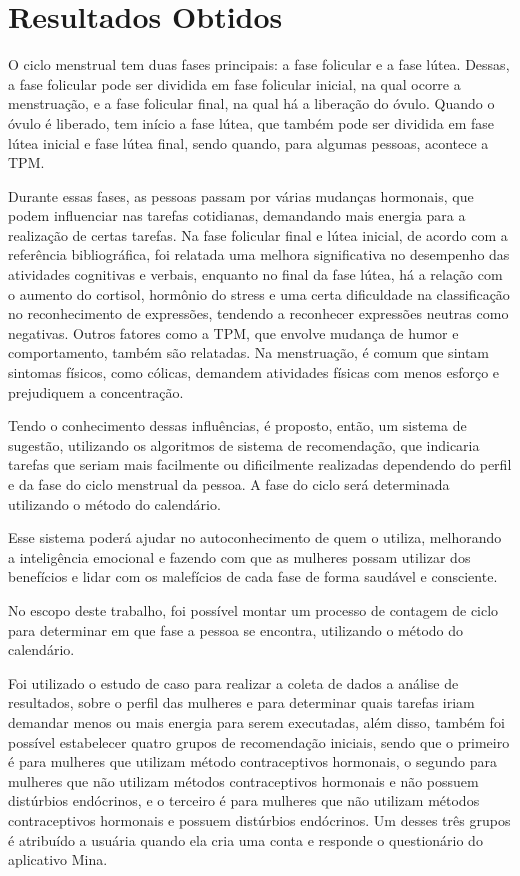 \chapter[Resultados Obtidos]{Resultados Obtidos}

O ciclo menstrual tem duas fases principais: a fase folicular e a fase lútea. Dessas, a fase folicular 
pode 
ser dividida em fase folicular inicial, na qual ocorre a menstruação, e a fase folicular final, na qual 
há a liberação do óvulo.
Quando o óvulo é liberado, tem início a fase lútea, que também pode ser dividida em fase lútea inicial e 
fase lútea final, sendo quando, para algumas pessoas, acontece a TPM.

Durante essas fases, as pessoas passam por várias mudanças hormonais, que podem influenciar nas tarefas 
cotidianas, demandando mais energia para a realização de certas tarefas. Na fase folicular final e lútea inicial, de acordo com a referência bibliográfica, 
foi relatada uma melhora significativa no desempenho das atividades cognitivas e verbais, enquanto no final da fase 
lútea, há a relação com o aumento do cortisol, hormônio do stress e uma certa dificuldade na classificação 
no reconhecimento de expressões, tendendo a reconhecer expressões neutras como negativas. Outros fatores como a TPM, que envolve
mudança de humor e comportamento, também são relatadas. Na menstruação, é comum que sintam sintomas físicos, como cólicas, demandem 
atividades físicas com menos esforço e prejudiquem a concentração. 

Tendo o conhecimento dessas influências, é proposto, então, um sistema de sugestão, utilizando os algoritmos de sistema de recomendação, 
que indicaria tarefas que seriam mais facilmente ou dificilmente realizadas dependendo do perfil e da fase do ciclo menstrual da pessoa. A fase 
do ciclo será determinada utilizando o método do calendário. 

Esse sistema poderá ajudar no autoconhecimento de quem o utiliza, melhorando a inteligência emocional e fazendo com que 
as mulheres possam utilizar dos benefícios e lidar com os malefícios de cada fase de forma saudável e consciente.

No escopo deste trabalho, foi possível montar um processo de contagem de ciclo para determinar em que fase a pessoa se encontra, utilizando o 
método do calendário.

Foi utilizado o estudo de caso para realizar a coleta de dados a análise de resultados, sobre o perfil das mulheres e para determinar quais tarefas iriam demandar 
menos ou mais energia para serem executadas, além disso, também foi possível estabelecer quatro grupos de recomendação iniciais, sendo que o 
primeiro é para mulheres que utilizam método contraceptivos hormonais, o segundo para mulheres que não utilizam métodos contraceptivos hormonais e 
não possuem distúrbios endócrinos, e o terceiro é para mulheres que não utilizam métodos contraceptivos hormonais e possuem distúrbios endócrinos. 
Um desses três grupos é atribuído a usuária quando ela cria uma conta e responde o questionário do aplicativo Mina. 

